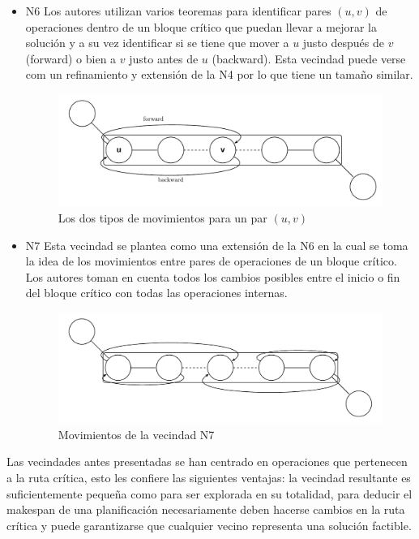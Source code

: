 \begin{itemize}
\item N6 \cite{Balas1998} Los autores utilizan varios teoremas para identificar pares $(u,v)$ de operaciones dentro de un bloque crítico que puedan llevar a mejorar la solución y a su vez identificar si se tiene que mover a $u$ justo después de $v$(forward) o bien a $v$ justo antes de $u$ (backward). Esta vecindad puede verse com un refinamiento y extensión de la N4 por lo que tiene un tamaño similar.
\begin{figure}[H]
\centering
\includegraphics[scale=.7]{Imagenes/N6.pdf}
\caption{Los dos tipos de movimientos para un par $(u,v)$}
\end{figure}

\item N7 \cite{Zhang2007} Esta vecindad se plantea como una extensión de la N6 en la cual se toma la idea de los movimientos entre pares de operaciones de un bloque crítico. Los autores toman en cuenta todos los cambios posibles entre el inicio o fin del bloque crítico con todas las operaciones internas.

\begin{figure}[H]
\centering
\includegraphics[scale=.7]{Imagenes/N7.pdf}
\caption{Movimientos de la vecindad N7}
\end{figure}
\end{itemize}

Las vecindades antes presentadas se han centrado en operaciones que pertenecen a la ruta crítica, esto les confiere las siguientes ventajas: la vecindad resultante es suficientemente pequeña como para ser explorada en su totalidad, para deducir el makespan de una planificación necesariamente deben hacerse cambios en la ruta crítica y puede garantizarse que cualquier vecino representa una solución factible\cite{balas1969machine}.\\

